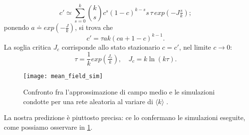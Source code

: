 \begin{equation}
	c' \simeq \sum_{s = 0}^k \binom{k}{s}c^s \left(1-c \right)^{k-s} s \, \tau \, exp(-J \tfrac{s}{k});
\end{equation}
ponendo $ a \doteq exp(- \tfrac{J}{k}) $, si trova che
\begin{equation}
	c' = \tau a k \left(c a + 1 - c \right)^{k-1}.
\end{equation}
La soglia critica $ J_c $ corrisponde allo stato stazionario $ c = c' $, nel limite $ c \rightarrow 0 $:
\begin{equation}
	\tau = \frac{1}{k} exp(\tfrac{J_c}{k}),\quad J_c = k \ln(k \tau).
\end{equation}

\begin{figure}[t]
		\begin{center}
			\texttt{[image: mean\_field\_sim]}
			\caption{Confronto fra l'approssimazione di campo medio e le simulazioni condotte per una rete aleatoria al variare di $ \langle k \rangle $ \cite{Bagnoli2014} .}
			\label{fig:sim}
		\end{center}
\end{figure}
La nostra predizione è piuttosto precisa: ce lo confermano le simulazioni eseguite, come possiamo osservare in \cref{fig:sim}.


